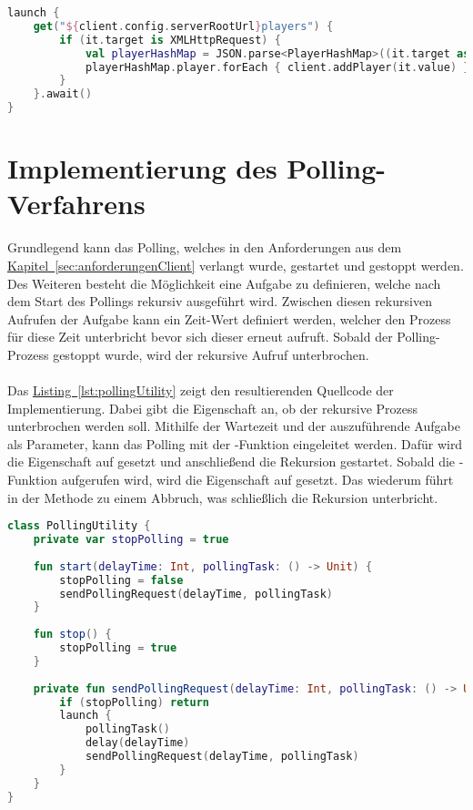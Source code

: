 \begin{lstlisting}[style=lstStyleFramed, language=Kotlin, caption={Funktionsaufruf eines \code{GET}-Requests am Beispiel der Playerliste}, label=lst:requestPlayerList, float]
launch {
	get("${client.config.serverRootUrl}players") {
		if (it.target is XMLHttpRequest) {
			val playerHashMap = JSON.parse<PlayerHashMap>((it.target as XMLHttpRequest).responseText)
			playerHashMap.player.forEach { client.addPlayer(it.value) }
		}
	}.await()
}
\end{lstlisting}

\section{Implementierung des Polling-Verfahrens}\label{sec:polling}
Grundlegend kann das Polling, welches in den Anforderungen aus dem \hyperref[sec:anforderungenClient]{Kapitel~\ref{sec:anforderungenClient}} verlangt wurde, gestartet und gestoppt werden. Des Weiteren besteht die Möglichkeit eine Aufgabe zu definieren, welche nach dem Start des Pollings rekursiv ausgeführt wird. Zwischen diesen rekursiven Aufrufen der Aufgabe kann ein Zeit-Wert definiert werden, welcher den Prozess für diese Zeit unterbricht bevor sich dieser erneut aufruft. Sobald der Polling-Prozess gestoppt wurde, wird der rekursive Aufruf unterbrochen.\\
\\
Das \hyperref[lst:pollingUtility]{Listing~\ref{lst:pollingUtility}} zeigt den resultierenden Quellcode der Implementierung. Dabei gibt die Eigenschaft  an, ob der rekursive Prozess unterbrochen werden soll. Mithilfe der Wartezeit und der auszuführende Aufgabe als Parameter, kann das Polling mit der -Funktion eingeleitet werden. Dafür wird die Eigenschaft  auf  gesetzt und anschließend die Rekursion gestartet. Sobald die -Funktion aufgerufen wird, wird die Eigenschaft  auf  gesetzt. Das wiederum führt in der Methode  zu einem Abbruch, was schließlich die Rekursion unterbricht.\\
\begin{lstlisting}[style=lstStyleFramed, language=Kotlin, caption={Implementierung der Klasse \code{PollingUtility} für die Umsetzung des Polling-Verfahrens}, label=lst:pollingUtility, float]
class PollingUtility {
	private var stopPolling = true
	
	fun start(delayTime: Int, pollingTask: () -> Unit) {
		stopPolling = false
		sendPollingRequest(delayTime, pollingTask)
	}
	
	fun stop() {
		stopPolling = true
	}
	
	private fun sendPollingRequest(delayTime: Int, pollingTask: () -> Unit) {
		if (stopPolling) return
		launch {
			pollingTask()
			delay(delayTime)
			sendPollingRequest(delayTime, pollingTask)
		}
	}
}
\end{lstlisting}
